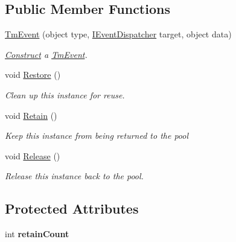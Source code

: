 \subsection*{Public Member Functions}
\begin{DoxyCompactItemize}
\item 
\hypertarget{classstrange_1_1extensions_1_1dispatcher_1_1eventdispatcher_1_1impl_1_1_tm_event_a606af8e7c4e19a2c4223e493e3b35987}{\hyperlink{classstrange_1_1extensions_1_1dispatcher_1_1eventdispatcher_1_1impl_1_1_tm_event_a606af8e7c4e19a2c4223e493e3b35987}{Tm\-Event} (object type, \hyperlink{interfacestrange_1_1extensions_1_1dispatcher_1_1eventdispatcher_1_1api_1_1_i_event_dispatcher}{I\-Event\-Dispatcher} target, object data)}\label{classstrange_1_1extensions_1_1dispatcher_1_1eventdispatcher_1_1impl_1_1_tm_event_a606af8e7c4e19a2c4223e493e3b35987}

\begin{DoxyCompactList}\small\item\em \hyperlink{class_construct}{Construct} a \hyperlink{classstrange_1_1extensions_1_1dispatcher_1_1eventdispatcher_1_1impl_1_1_tm_event}{Tm\-Event}. \end{DoxyCompactList}\item 
void \hyperlink{classstrange_1_1extensions_1_1dispatcher_1_1eventdispatcher_1_1impl_1_1_tm_event_aa20d15da3bdbddf1f29d923cdc58a1e6}{Restore} ()
\begin{DoxyCompactList}\small\item\em Clean up this instance for reuse. \end{DoxyCompactList}\item 
void \hyperlink{classstrange_1_1extensions_1_1dispatcher_1_1eventdispatcher_1_1impl_1_1_tm_event_aacd0c47bb3adedb6e4934b7cbea6cab0}{Retain} ()
\begin{DoxyCompactList}\small\item\em Keep this instance from being returned to the pool \end{DoxyCompactList}\item 
void \hyperlink{classstrange_1_1extensions_1_1dispatcher_1_1eventdispatcher_1_1impl_1_1_tm_event_a7a386063d3c752a4d586ecb5c4bd8f6d}{Release} ()
\begin{DoxyCompactList}\small\item\em Release this instance back to the pool. \end{DoxyCompactList}\end{DoxyCompactItemize}
\subsection*{Protected Attributes}
\begin{DoxyCompactItemize}
\item 
\hypertarget{classstrange_1_1extensions_1_1dispatcher_1_1eventdispatcher_1_1impl_1_1_tm_event_abd968ace85be8d2ed1209926dc03a73c}{int {\bfseries retain\-Count}}\label{classstrange_1_1extensions_1_1dispatcher_1_1eventdispatcher_1_1impl_1_1_tm_event_abd968ace85be8d2ed1209926dc03a73c}

\end{DoxyCompactItemize}
